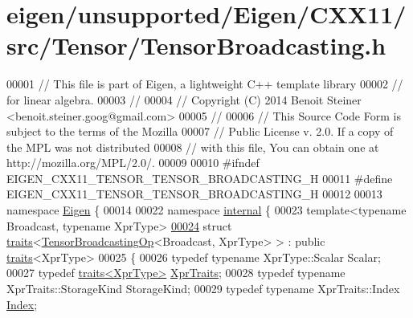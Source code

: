 \hypertarget{eigen_2unsupported_2_eigen_2_c_x_x11_2src_2_tensor_2_tensor_broadcasting_8h_source}{}\section{eigen/unsupported/\+Eigen/\+C\+X\+X11/src/\+Tensor/\+Tensor\+Broadcasting.h}
\label{eigen_2unsupported_2_eigen_2_c_x_x11_2src_2_tensor_2_tensor_broadcasting_8h_source}

\begin{DoxyCode}
00001 \textcolor{comment}{// This file is part of Eigen, a lightweight C++ template library}
00002 \textcolor{comment}{// for linear algebra.}
00003 \textcolor{comment}{//}
00004 \textcolor{comment}{// Copyright (C) 2014 Benoit Steiner <benoit.steiner.goog@gmail.com>}
00005 \textcolor{comment}{//}
00006 \textcolor{comment}{// This Source Code Form is subject to the terms of the Mozilla}
00007 \textcolor{comment}{// Public License v. 2.0. If a copy of the MPL was not distributed}
00008 \textcolor{comment}{// with this file, You can obtain one at http://mozilla.org/MPL/2.0/.}
00009 
00010 \textcolor{preprocessor}{#ifndef EIGEN\_CXX11\_TENSOR\_TENSOR\_BROADCASTING\_H}
00011 \textcolor{preprocessor}{#define EIGEN\_CXX11\_TENSOR\_TENSOR\_BROADCASTING\_H}
00012 
00013 \textcolor{keyword}{namespace }\hyperlink{namespace_eigen}{Eigen} \{
00014 
00022 \textcolor{keyword}{namespace }\hyperlink{namespaceinternal}{internal} \{
00023 \textcolor{keyword}{template}<\textcolor{keyword}{typename} Broadcast, \textcolor{keyword}{typename} XprType>
\hyperlink{struct_eigen_1_1internal_1_1traits_3_01_tensor_broadcasting_op_3_01_broadcast_00_01_xpr_type_01_4_01_4}{00024} \textcolor{keyword}{struct }\hyperlink{struct_eigen_1_1internal_1_1traits}{traits}<\hyperlink{class_eigen_1_1_tensor_broadcasting_op}{TensorBroadcastingOp}<Broadcast, XprType> > : \textcolor{keyword}{public} 
      \hyperlink{struct_eigen_1_1internal_1_1traits}{traits}<XprType>
00025 \{
00026   \textcolor{keyword}{typedef} \textcolor{keyword}{typename} XprType::Scalar Scalar;
00027   \textcolor{keyword}{typedef} \hyperlink{struct_eigen_1_1internal_1_1traits}{traits<XprType>} \hyperlink{struct_eigen_1_1internal_1_1traits}{XprTraits};
00028   \textcolor{keyword}{typedef} \textcolor{keyword}{typename} XprTraits::StorageKind StorageKind;
00029   \textcolor{keyword}{typedef} \textcolor{keyword}{typename} XprTraits::Index \hyperlink{namespace_eigen_a62e77e0933482dafde8fe197d9a2cfde}{Index};

\end{DoxyCode}
